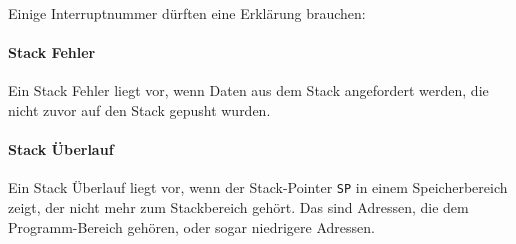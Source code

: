 Einige Interruptnummer dürften eine Erklärung brauchen:

\paragraph{Stack Fehler}
Ein Stack Fehler liegt vor, wenn Daten aus dem Stack angefordert werden, die
nicht zuvor auf den Stack gepusht wurden.


\paragraph{Stack Überlauf}
Ein Stack Überlauf liegt vor, wenn der Stack-Pointer \texttt{SP} in einem
Speicherbereich zeigt, der nicht mehr zum Stackbereich gehört. Das sind
Adressen, die dem Programm-Bereich gehören, oder sogar niedrigere Adressen.






